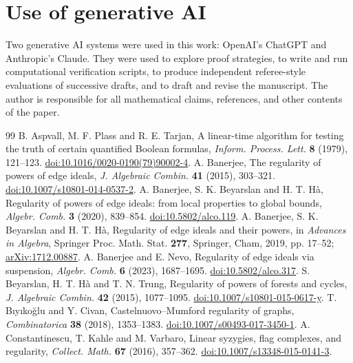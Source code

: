 \documentclass[11pt,a4paper]{article}
\theoremstyle{definition}
\begin{document}
\section*{Use of generative AI}
Two generative AI systems were used in this work: OpenAI's ChatGPT and Anthropic's Claude. They were used to explore proof strategies, to write and run computational verification scripts, to produce independent referee-style evaluations of successive drafts, and to draft and revise the manuscript. The author is responsible for all mathematical claims, references, and other contents of the paper.

\begin{thebibliography}{99}
 B. Aspvall, M. F. Plass and R. E. Tarjan, A linear-time algorithm for testing the truth of certain quantified Boolean formulas, \emph{Inform. Process. Lett.} \textbf{8} (1979), 121--123. \href{https://doi.org/10.1016/0020-0190(79)90002-4}{doi:10.1016/0020-0190(79)90002-4}.
 A. Banerjee, The regularity of powers of edge ideals, \emph{J. Algebraic Combin.} \textbf{41} (2015), 303--321. \href{https://doi.org/10.1007/s10801-014-0537-2}{doi:10.1007/s10801-014-0537-2}.
 A. Banerjee, S. K. Beyarslan and H. T. H\`a, Regularity of powers of edge ideals: from local properties to global bounds, \emph{Algebr. Comb.} \textbf{3} (2020), 839--854. \href{https://doi.org/10.5802/alco.119}{doi:10.5802/alco.119}.
 A. Banerjee, S. K. Beyarslan and H. T. H\`a, Regularity of edge ideals and their powers, in \emph{Advances in Algebra}, Springer Proc. Math. Stat. \textbf{277}, Springer, Cham, 2019, pp. 17--52; \href{https://arxiv.org/abs/1712.00887}{arXiv:1712.00887}.
 A. Banerjee and E. Nevo, Regularity of edge ideals via suspension, \emph{Algebr. Comb.} \textbf{6} (2023), 1687--1695. \href{https://doi.org/10.5802/alco.317}{doi:10.5802/alco.317}.
 S. Beyarslan, H. T. H\`a and T. N. Trung, Regularity of powers of forests and cycles, \emph{J. Algebraic Combin.} \textbf{42} (2015), 1077--1095. \href{https://doi.org/10.1007/s10801-015-0617-y}{doi:10.1007/s10801-015-0617-y}.
 T. B\i y\i ko\u{g}lu and Y. Civan, Castelnuovo--Mumford regularity of graphs, \emph{Combinatorica} \textbf{38} (2018), 1353--1383. \href{https://doi.org/10.1007/s00493-017-3450-1}{doi:10.1007/s00493-017-3450-1}.
 A. Constantinescu, T. Kahle and M. Varbaro, Linear syzygies, flag complexes, and regularity, \emph{Collect. Math.} \textbf{67} (2016), 357--362. \href{https://doi.org/10.1007/s13348-015-0141-3}{doi:10.1007/s13348-015-0141-3}.

\end{thebibliography}
\end{document}
